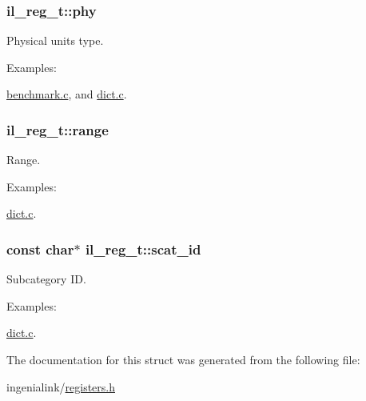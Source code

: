 \subsubsection[{\texorpdfstring{phy}{phy}}]{ il\+\_\+reg\+\_\+t\+::phy}\hypertarget{structil__reg__t_a799847eb04e4f29073e7c9939ae977df}{}\label{structil__reg__t_a799847eb04e4f29073e7c9939ae977df}


Physical units type. 

\begin{Desc}
\item[Examples\+: ]\par
\hyperlink{benchmark_8c-example}{benchmark.\+c}, and \hyperlink{dict_8c-example}{dict.\+c}.\end{Desc}
\subsubsection[{\texorpdfstring{range}{range}}]{ il\+\_\+reg\+\_\+t\+::range}\hypertarget{structil__reg__t_acb9979e9f542ec4b683a6b2b603d4bea}{}\label{structil__reg__t_acb9979e9f542ec4b683a6b2b603d4bea}


Range. 

\begin{Desc}
\item[Examples\+: ]\par
\hyperlink{dict_8c-example}{dict.\+c}.\end{Desc}
\subsubsection[{\texorpdfstring{scat\+\_\+id}{scat_id}}]{\setlength{\rightskip}{0pt plus 5cm}const char$\ast$ il\+\_\+reg\+\_\+t\+::scat\+\_\+id}\hypertarget{structil__reg__t_a827bdfd4438dc720a322ec17c17afe2f}{}\label{structil__reg__t_a827bdfd4438dc720a322ec17c17afe2f}


Subcategory ID. 

\begin{Desc}
\item[Examples\+: ]\par
\hyperlink{dict_8c-example}{dict.\+c}.\end{Desc}


The documentation for this struct was generated from the following file\+:\begin{DoxyCompactItemize}
\item 
ingenialink/\hyperlink{registers_8h}{registers.\+h}\end{DoxyCompactItemize}
